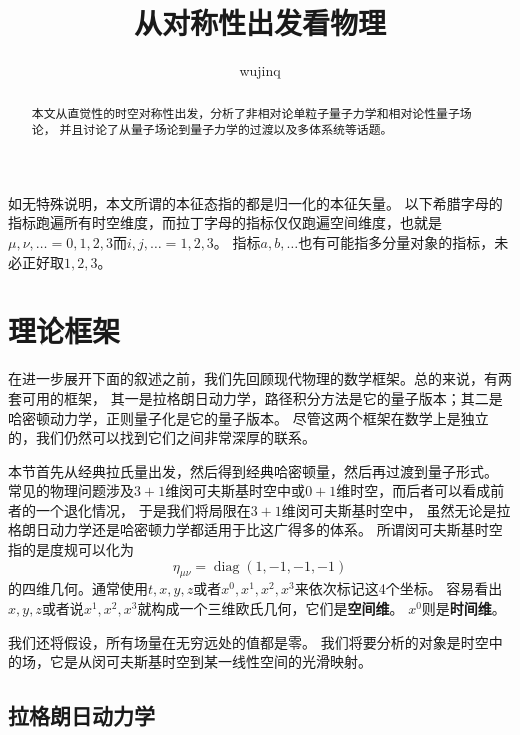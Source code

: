 \documentclass[hyperref, UTF8, a4paper]{ctexart}
\title{从对称性出发看物理}
\author{wujinq}
\DeclareMathOperator{\diag}{diag}
\begin{document}
\maketitle

\begin{abstract}
    本文从直觉性的时空对称性出发，分析了非相对论单粒子量子力学和相对论性量子场论，
    并且讨论了从量子场论到量子力学的过渡以及多体系统等话题。
\end{abstract}
\vspace{2em}

如无特殊说明，本文所谓的本征态指的都是归一化的本征矢量。
以下希腊字母的指标跑遍所有时空维度，而拉丁字母的指标仅仅跑遍空间维度，也就是$\mu, \nu, \ldots = 0, 1, 2, 3$而$i, j, \ldots = 1, 2, 3$。
指标$a,b,\ldots$也有可能指多分量对象的指标，未必正好取$1, 2, 3$。

\section{理论框架}

在进一步展开下面的叙述之前，我们先回顾现代物理的数学框架。总的来说，有两套可用的框架，
其一是拉格朗日动力学，路径积分方法是它的量子版本；其二是哈密顿动力学，正则量子化是它的量子版本。
尽管这两个框架在数学上是独立的，我们仍然可以找到它们之间非常深厚的联系。

本节首先从经典拉氏量出发，然后得到经典哈密顿量，然后再过渡到量子形式。
常见的物理问题涉及$3+1$维闵可夫斯基时空中或$0+1$维时空，而后者可以看成前者的一个退化情况，
于是我们将局限在$3+1$维闵可夫斯基时空中，
虽然无论是拉格朗日动力学还是哈密顿力学都适用于比这广得多的体系。
所谓闵可夫斯基时空指的是度规可以化为
\begin{equation}
    \eta_{\mu\nu} = \diag (1, -1, -1, -1)
\end{equation}
的四维几何。通常使用$t, x, y, z$或者$x^0, x^1, x^2, x^3$来依次标记这4个坐标。
容易看出$x, y, z$或者说$x^1, x^2, x^3$就构成一个三维欧氏几何，它们是\textbf{空间维}。
$x^0$则是\textbf{时间维}。

我们还将假设，所有场量在无穷远处的值都是零。
我们将要分析的对象是时空中的场，它是从闵可夫斯基时空到某一线性空间的光滑映射。

\subsection{拉格朗日动力学}
\end{document}
